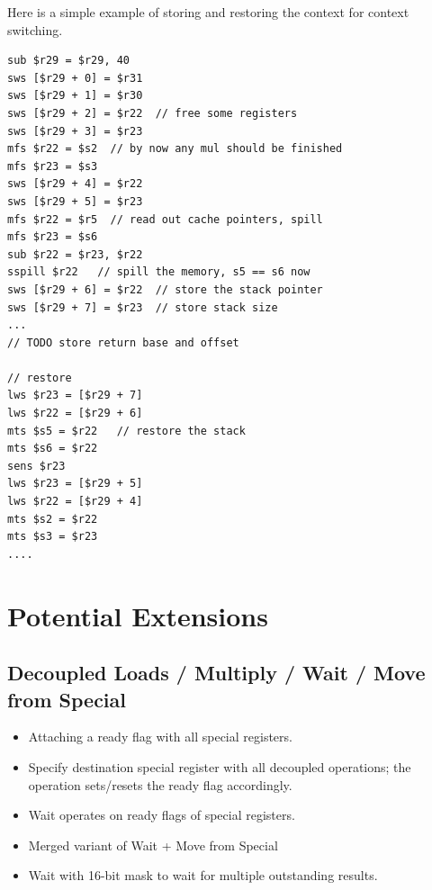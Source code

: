 \documentclass[a4paper,fontsize=10pt,twoside,DIV15,BCOR12mm,headinclude=true,footinclude=false,pagesize,bibtotoc]{scrbook}
\newcommand{\comment}[3]{

\textsf{\textbf{#1}} {\color{#3}#2}}
\newcommand{\stefan}[1]{\comment{Stefan}{#1}{RoyalPurple}}
\renewcommand{\stefan}[1]{}
\begin{document}
Here is a simple example of storing and restoring the context for context switching.
\begin{verbatim}
sub $r29 = $r29, 40
sws [$r29 + 0] = $r31
sws [$r29 + 1] = $r30
sws [$r29 + 2] = $r22  // free some registers
sws [$r29 + 3] = $r23
mfs $r22 = $s2  // by now any mul should be finished
mfs $r23 = $s3
sws [$r29 + 4] = $r22
sws [$r29 + 5] = $r23
mfs $r22 = $r5  // read out cache pointers, spill
mfs $r23 = $s6
sub $r22 = $r23, $r22
sspill $r22   // spill the memory, s5 == s6 now
sws [$r29 + 6] = $r22  // store the stack pointer
sws [$r29 + 7] = $r23  // store stack size
...
// TODO store return base and offset

// restore
lws $r23 = [$r29 + 7]
lws $r22 = [$r29 + 6]
mts $s5 = $r22   // restore the stack
mts $s6 = $r22
sens $r23
lws $r23 = [$r29 + 5]
lws $r22 = [$r29 + 4]
mts $s2 = $r22
mts $s3 = $r23
....
\end{verbatim}

\stefan{We need to define how to register interrupts, how to return from interrupts (where do we get
the return-base and return-offset from,..). Interrupt handlers in C are currently not supported,
the compiler does not restore all the special registers for normal functions.}

\chapter{Potential Extensions}

\section{Decoupled Loads / Multiply / Wait / Move from Special}

\begin{itemize}
  \item Attaching a ready flag with all special registers.
  \item Specify destination special register with all decoupled operations; the
        operation sets/resets the ready flag accordingly.
  \item Wait operates on ready flags of special registers.
  \item Merged variant of Wait + Move from Special
  \item Wait with 16-bit mask to wait for multiple outstanding results.
\end{itemize}
\end{document}
